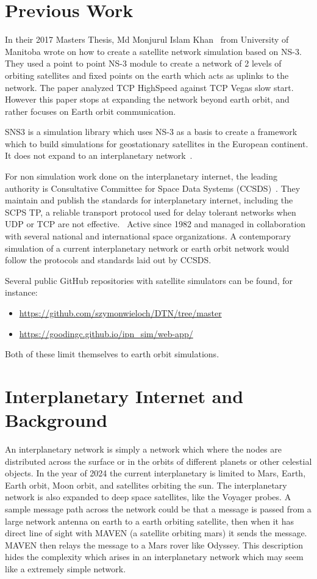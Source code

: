 \documentclass[a4paper,12pt]{article}
\begin{document}
\section{Previous Work}

In their 2017 Masters Thesis, Md Monjurul Islam Khan~\cite{Khan2017} from
University of Manitoba wrote on how to create a satellite network simulation
based on NS-3. They used a point to point NS-3 module to create a network of 2
levels of orbiting satellites and fixed points on the earth which acts as
uplinks to the network. The paper analyzed TCP HighSpeed against TCP Vegas slow
start. However this paper stops at expanding the network beyond earth orbit, and
rather focuses on Earth orbit communication.

SNS3 is a simulation library which uses NS-3 as a basis to create a framework
which to build simulations for geostationary satellites in the European
continent. It does not expand to an interplanetary network~\cite{Puttonen2014}.

For non simulation work done on the interplanetary internet, the leading
authority is Consultative Committee for Space Data Systems
(CCSDS)~\cite{CCSDS.org}. They maintain and publish the standards for
interplanetary internet, including the SCPS TP, a reliable transport protocol
used for delay tolerant networks when UDP or TCP are not
effective.~\cite{Keith2004} Active since 1982 and managed in collaboration with
several national and international space organizations. A contemporary
simulation of a current interplanetary network or earth orbit network would
follow the protocols and standards laid out by CCSDS.

Several public GitHub repositories with satellite simulators can be
found, for instance:
\begin{itemize}
\item\url{https://github.com/szymonwieloch/DTN/tree/master}
\item\url{https://goodingc.github.io/ipn_sim/web-app/}
\end{itemize}
Both of these limit themselves to earth orbit simulations.

\section{Interplanetary Internet and Background}

An interplanetary network is simply a network which where the nodes are
distributed across the surface or in the orbits of different planets or other celestial objects.
In the year of
2024 the current interplanetary is limited to Mars, Earth, Earth orbit, Moon orbit, and
satellites orbiting the sun. The interplanetary network is also expanded to deep
space satellites, like the Voyager probes. A sample message path across the
network could be that a message is passed from a large network antenna on earth
to a earth orbiting satellite, then when it has direct line of
sight with MAVEN (a satellite orbiting mars) it sends the message. MAVEN then relays the message to a
Mars rover like Odyssey. This description hides the complexity which arises in
an interplanetary network which may seem like a extremely simple network.
\end{document}
